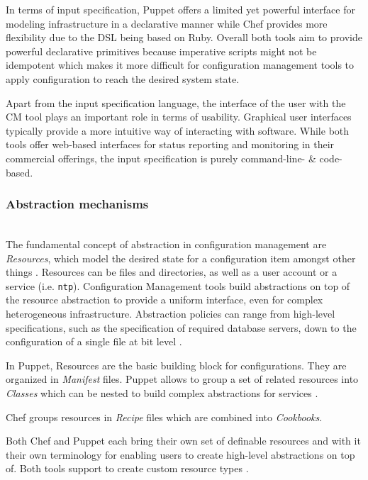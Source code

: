 
In terms of input specification, Puppet offers a limited yet powerful interface for modeling infrastructure in a declarative manner while Chef provides more flexibility due to the DSL being based on Ruby. Overall both tools aim to provide powerful declarative primitives because imperative scripts might not be idempotent which makes it more difficult for configuration management tools to apply configuration to reach the desired system state.

Apart from the input specification language, the interface of the user with the CM tool plays an important role in terms of usability. Graphical user interfaces typically provide a more intuitive way of interacting with software. While both tools offer web-based interfaces for status reporting and monitoring in their commercial offerings, the input specification is purely command-line- \& code-based.

\subsubsection{Abstraction mechanisms}\hfill\\

The fundamental concept of abstraction in configuration management are \textit{Resources}, which model the desired state for a configuration item amongst other things \cite{chefioresource}. Resources can be files and directories, as well as a user account or a service (i.e. \texttt{ntp}). Configuration Management tools build abstractions on top of the resource abstraction to provide a uniform interface, even for complex heterogeneous infrastructure. Abstraction policies can range from high-level specifications, such as the specification of required database servers, down to the configuration of a single file at bit level \cite{delaet2010survey}.

In Puppet, Resources are the basic building block for configurations. They are organized in \textit{Manifest} files. Puppet allows to group a set of related resources into \textit{Classes} which can be nested to build complex abstractions for services \cite{puppetcomlangsum}.

Chef groups resources in \textit{Recipe} files which are combined into \textit{Cookbooks}. 

Both Chef and Puppet each bring their own set of definable resources and with it their own terminology for enabling users to create high-level abstractions on top of. Both tools support to create custom resource types \cite{chefcustomresources}\cite{puppetcustomtypes}.


